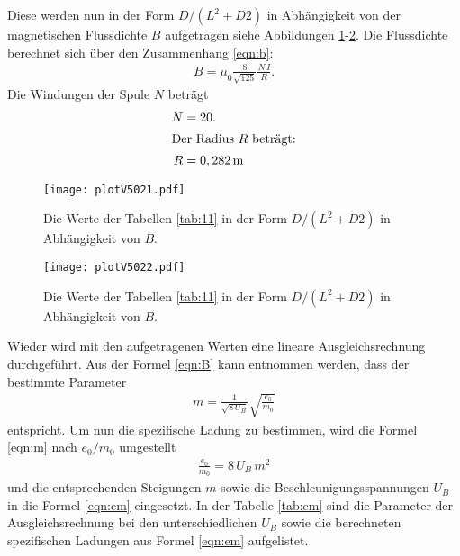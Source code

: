 Diese werden nun in der Form $D/(L^2+D2)$ in Abhängigkeit von der magnetischen Flussdichte $B$ aufgetragen
siehe Abbildungen \ref{fig:11}-\ref{fig:22}.
Die Flussdichte berechnet sich über den Zusammenhang \eqref{eqn:b}:
\begin{align}
  B=\mu_0\frac{8}{\sqrt{125}}\frac{N\,I}{R}.\label{eqn:b}
\end{align}
Die Windungen der Spule $N$ beträgt
\begin{align*}
  N&=20.\\
  \intertext{Der Radius $R$ beträgt:}
R&=0,282\,\si{\meter}
\end{align*}

\begin{figure}
 \centering
 \texttt{[image: plotV5021.pdf]}
 \caption{Die Werte der Tabellen \ref{tab:11}
in der Form $D/(L^2+D2)$ in Abhängigkeit von $B$.}
 \label{fig:11}
\end{figure}


\begin{figure}
 \centering
 \texttt{[image: plotV5022.pdf]}
 \caption{Die Werte der Tabellen \ref{tab:11}
  in der Form $D/(L^2+D2)$ in Abhängigkeit von $B$.}
 \label{fig:22}
\end{figure}

Wieder wird mit den aufgetragenen Werten
eine lineare Ausgleichsrechnung durchgeführt.
Aus der Formel \eqref{eqn:B} kann
entnommen werden, dass
der bestimmte Parameter
\begin{align}
m=\frac{1}{\sqrt{8\,U_B}}\sqrt{\frac{e_0}{m_0}}\label{eqn:m}
\end{align}
entspricht. Um nun die spezifische Ladung zu bestimmen,
 wird die Formel \eqref{eqn:m} nach $e_0/m_0$ umgestellt
\begin{align}
  \frac{e_0}{m_0}=8\,U_B\,m^2 \label{eqn:em}
\end{align}
und die entsprechenden Steigungen $m$ sowie die
Beschleunigungsspannungen $U_B$ in die Formel \eqref{eqn:em}
eingesetzt.
In der Tabelle \ref{tab:em} sind die Parameter der
Ausgleichsrechnung bei den unterschiedlichen $U_B$
sowie die berechneten spezifischen Ladungen aus Formel \eqref{eqn:em}
aufgelistet.


